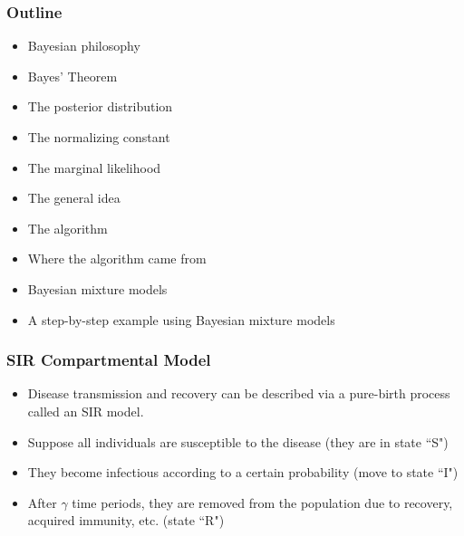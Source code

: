 \documentclass[11pt]{beamer}
\newcommand{\backindent}{\setlength\itemindent{-25pt} \item}
\begin{document}
\frame
{
\frametitle{Outline}
	\begin{itemize}{\itemsep=0.25in}
		\item Bayesian philosophy
		\item Bayes' Theorem
		\item The posterior distribution
		\item The normalizing constant
		\item The marginal likelihood
		\item The general idea
		\item The algorithm
		\item Where the algorithm came from
		\item Bayesian mixture models
		\item A step-by-step example using Bayesian mixture models
	\end{itemize}
}



\frame
{
\frametitle{SIR Compartmental Model}
	\begin{itemize}
		\backindent Disease transmission and recovery can be described via a pure-birth process called an SIR model.	
		\vspace{0.05in}	
		\item Suppose all individuals are susceptible to the disease (they are in state ``S")
		\vspace{0.05in}
		\item They become infectious according to a certain probability (move to state ``I")
		\vspace{0.05in}
		\item After $\gamma$ time periods, they are removed from the population due to recovery, acquired immunity, etc. (state ``R")

	\end{itemize}
}

%
\end{document}
